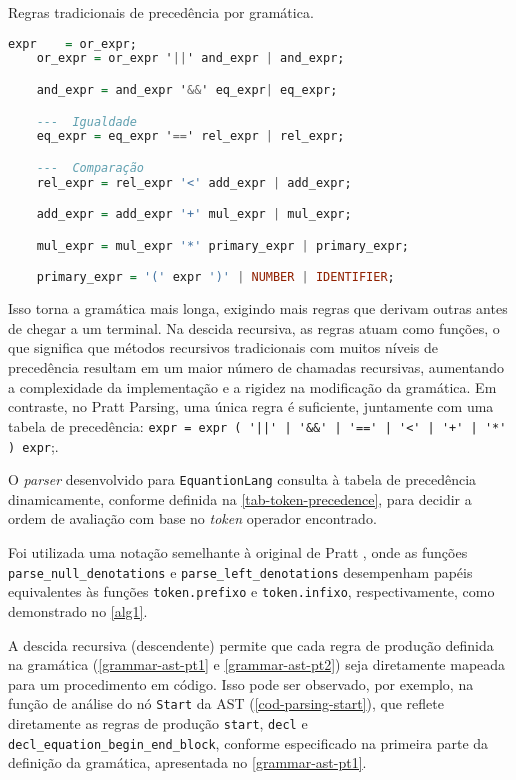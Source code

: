\begin{codigo}[htb]
    \caption{\small Regras tradicionais de precedência por gramática. }
    \label{cod-regras-tradicionais}
\begin{lstlisting}[language=haskell, numbers=none, inputencoding=utf8]
    expr    = or_expr;
    or_expr = or_expr '||' and_expr | and_expr;

    and_expr = and_expr '&&' eq_expr| eq_expr;

    ---  Igualdade
    eq_expr = eq_expr '==' rel_expr | rel_expr;   

    ---  Comparação
    rel_expr = rel_expr '<' add_expr | add_expr;     

    add_expr = add_expr '+' mul_expr | mul_expr;

    mul_expr = mul_expr '*' primary_expr | primary_expr;

    primary_expr = '(' expr ')' | NUMBER | IDENTIFIER; 
\end{lstlisting}
\end{codigo}

Isso torna a gramática mais longa, exigindo mais regras que derivam outras antes de chegar a um terminal. Na descida recursiva, as regras atuam como funções, o que significa que métodos recursivos tradicionais com muitos níveis de precedência resultam em um maior número de chamadas recursivas, aumentando a complexidade da implementação e a rigidez na modificação da gramática. Em contraste, no Pratt Parsing, uma única regra é suficiente, juntamente com uma tabela de precedência: \verb"expr = expr ( '||' | '&&' | '==' | '<' | '+' | '*' ) expr";.

O \textit{parser} desenvolvido para \texttt{EquantionLang} consulta à tabela de precedência dinamicamente, conforme definida na \autoref{tab-token-precedence}, para decidir a ordem de avaliação com base no \textit{token} operador encontrado.


Foi utilizada uma notação semelhante à original de Pratt \cite{pratt}, onde as funções \verb"parse_null_denotations" e \verb"parse_left_denotations" desempenham papéis equivalentes às funções \texttt{token.prefixo} e \texttt{token.infixo}, respectivamente, como demonstrado no \autoref{alg1}.

A descida recursiva (descendente) permite que cada regra de produção definida na gramática (\autoref{grammar-ast-pt1} e \autoref{grammar-ast-pt2}) seja diretamente mapeada para um procedimento em código. Isso pode ser observado, por exemplo, na função de análise do nó \texttt{Start} da AST (\autoref{cod-parsing-start}), que reflete diretamente as regras de produção \texttt{start}, \texttt{decl} e \verb"decl_equation_begin_end_block", conforme especificado na primeira parte da definição da gramática, apresentada no \autoref{grammar-ast-pt1}.

